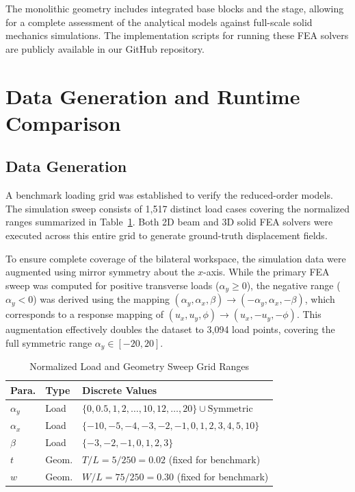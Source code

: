 \documentclass[colorlinks,upint,subscriptcorrection,varvw,hyphenate,balance]{asmeconf} %
\begin{document}
The monolithic geometry includes integrated base blocks and the stage, allowing for a complete assessment of the analytical models against full-scale solid mechanics simulations. The implementation scripts for running these FEA solvers are publicly available in our GitHub repository.


\section{Data Generation and Runtime Comparison}
\subsection{Data Generation}
A benchmark loading grid was established to verify the reduced-order models. The simulation sweep consists of 1,517 distinct load cases covering the normalized ranges summarized in Table~\ref{tab:load_sweep}. Both 2D beam and 3D solid FEA solvers were executed across this entire grid to generate ground-truth displacement fields. 

To ensure complete coverage of the bilateral workspace, the simulation data were augmented using mirror symmetry about the $x$-axis. While the primary FEA sweep was computed for positive transverse loads ($\alpha_y \geq 0$), the negative range ($\alpha_y < 0$) was derived using the mapping $(\alpha_y, \alpha_x, \beta) \to (-\alpha_y, \alpha_x, -\beta)$, which corresponds to a response mapping of $(u_x, u_y, \phi) \to (u_x, -u_y, -\phi)$. This augmentation effectively doubles the dataset to 3,094 load points, covering the full symmetric range $\alpha_y \in [-20, 20]$.

\begin{table}[ht]
\centering
\caption{Normalized Load and Geometry Sweep Grid Ranges}
\label{tab:load_sweep}
\begin{tabular}{lll}
\toprule
\textbf{Para.} & \textbf{Type} & \textbf{Discrete Values} \\
\midrule
$\alpha_y$ & Load  & $\{0, 0.5, 1, 2, \dots, 10, 12, \dots, 20\} \cup \text{Symmetric}$ \\
$\alpha_x$ & Load  & $\{-10, -5, -4, -3, -2, -1, 0, 1, 2, 3, 4, 5, 10\}$ \\
$\beta$    & Load  & $\{-3, -2, -1, 0, 1, 2, 3\}$ \\
$t$        & Geom. & $T/L = 5/250 = 0.02$ (fixed for benchmark) \\
$w$        & Geom. & $W/L = 75/250 = 0.30$ (fixed for benchmark) \\
\bottomrule
\end{tabular}
\end{table}
\end{document}
